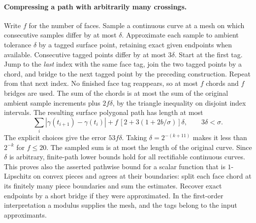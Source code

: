 \paragraph{Compressing a path with arbitrarily many crossings.}
Write $f$ for the number of faces. Sample a continuous curve at a mesh on which consecutive samples differ by at most $\delta$. Approximate each sample to ambient tolerance $\delta$ by a tagged surface point, retaining exact given endpoints when available. Consecutive tagged points differ by at most $3\delta$. Start at the first tag. Jump to the \emph{last} index with the same face tag, join the two tagged points by a chord, and bridge to the next tagged point by the preceding construction. Repeat from that next index. No finished face tag reappears, so at most $f$ chords and $f$ bridges are used. The sum of the chords is at most the sum of the original ambient sample increments plus $2f\delta$, by the triangle inequality on disjoint index intervals. The resulting surface polygonal path has length at most
\[
  \sum_i|\gamma(t_{i+1})-\gamma(t_i)|
    + f\,[2+3(1+2b/\sigma)]\delta,\qquad 3\delta<\sigma .
\]
The explicit choices give the error $53f\delta$. Taking $\delta=2^{-(k+11)}$ makes it less than $2^{-k}$ for $f\le20$. The sampled sum is at most the length of the original curve. Since $\delta$ is arbitrary, finite-path lower bounds hold for all rectifiable continuous curves. This proves also the asserted pathwise bound for a scalar function that is $1$-Lipschitz on convex pieces and agrees at their boundaries: split each face chord at its finitely many piece boundaries and sum the estimates. Recover exact endpoints by a short bridge if they were approximated. In the first-order interpretation a modulus supplies the mesh, and the tags belong to the input approximants.

